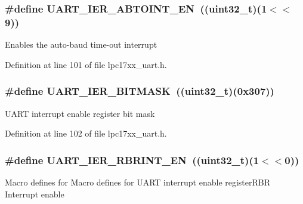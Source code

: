 \subsubsection[{\texorpdfstring{U\+A\+R\+T\+\_\+\+I\+E\+R\+\_\+\+A\+B\+T\+O\+I\+N\+T\+\_\+\+EN}{UART_IER_ABTOINT_EN}}]{\setlength{\rightskip}{0pt plus 5cm}\#define U\+A\+R\+T\+\_\+\+I\+E\+R\+\_\+\+A\+B\+T\+O\+I\+N\+T\+\_\+\+EN~(({\bf uint32\+\_\+t})(1$<$$<$9))}\hypertarget{group___u_a_r_t___private___macros_gac6579cde413efce70ee1103ef278368f}{}\label{group___u_a_r_t___private___macros_gac6579cde413efce70ee1103ef278368f}
Enables the auto-\/baud time-\/out interrupt 

Definition at line 101 of file lpc17xx\+\_\+uart.\+h.

\subsubsection[{\texorpdfstring{U\+A\+R\+T\+\_\+\+I\+E\+R\+\_\+\+B\+I\+T\+M\+A\+SK}{UART_IER_BITMASK}}]{\setlength{\rightskip}{0pt plus 5cm}\#define U\+A\+R\+T\+\_\+\+I\+E\+R\+\_\+\+B\+I\+T\+M\+A\+SK~(({\bf uint32\+\_\+t})(0x307))}\hypertarget{group___u_a_r_t___private___macros_ga101e57e41855d1262e9d9b747854542f}{}\label{group___u_a_r_t___private___macros_ga101e57e41855d1262e9d9b747854542f}
U\+A\+RT interrupt enable register bit mask 

Definition at line 102 of file lpc17xx\+\_\+uart.\+h.

\subsubsection[{\texorpdfstring{U\+A\+R\+T\+\_\+\+I\+E\+R\+\_\+\+R\+B\+R\+I\+N\+T\+\_\+\+EN}{UART_IER_RBRINT_EN}}]{\setlength{\rightskip}{0pt plus 5cm}\#define U\+A\+R\+T\+\_\+\+I\+E\+R\+\_\+\+R\+B\+R\+I\+N\+T\+\_\+\+EN~(({\bf uint32\+\_\+t})(1$<$$<$0))}\hypertarget{group___u_a_r_t___private___macros_gad6400102a6ec4fa634656b7ef18d1eba}{}\label{group___u_a_r_t___private___macros_gad6400102a6ec4fa634656b7ef18d1eba}
Macro defines for Macro defines for U\+A\+RT interrupt enable register\+R\+BR Interrupt enable 


